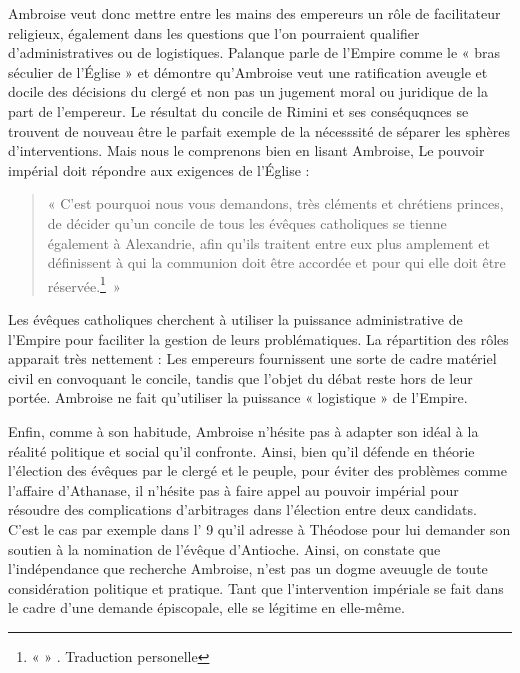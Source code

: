\bigskip

Ambroise veut donc mettre entre les mains des empereurs un rôle de facilitateur religieux, également dans les questions que l'on pourraient qualifier d'administratives ou de logistiques. Palanque parle de l'Empire comme le « bras séculier de l'Église » et démontre qu'Ambroise veut une ratification aveugle et docile des décisions du clergé et non pas un jugement moral ou juridique de la part de l'empereur\autocite[372]{palanque_ambroise}. Le résultat du concile de Rimini et ses conséquqnces se trouvent de nouveau être le parfait exemple de la nécesssité de séparer les sphères d'interventions. Mais nous le comprenons bien en lisant Ambroise, Le pouvoir impérial doit répondre aux exigences de l'Église :

\bigskip

\begin{quote}
    « C'est pourquoi nous vous demandons, très cléments et chrétiens princes, de décider qu'un concile de tous les évêques catholiques se tienne également à Alexandrie, afin qu'ils traitent entre eux plus amplement et définissent à qui la communion doit être accordée et pour qui elle doit être réservée.\footnote{«  » \cite[\nopp ec. 6, 5]{ambroise_csel_82_3}. {Traduction personelle}}~»
\end{quote}

\bigskip

Les évêques catholiques cherchent à utiliser la puissance administrative de l'Empire pour faciliter la gestion de leurs problématiques. La répartition des rôles apparait très nettement : Les empereurs fournissent une sorte de cadre matériel civil en convoquant le concile, tandis que l'objet du débat reste hors de leur portée. Ambroise ne fait qu'utiliser la puissance « logistique » de l'Empire.

\bigskip

Enfin, comme à son habitude, Ambroise n'hésite pas à adapter son idéal à la réalité politique et social qu'il confronte. Ainsi, bien qu'il défende en théorie l'élection des évêques par le clergé et le peuple, pour éviter des problèmes comme l'affaire d'Athanase, il n'hésite pas à faire appel au pouvoir impérial pour résoudre des complications d'arbitrages dans l'élection entre deux candidats. C'est le cas par exemple dans l' 9 qu'il adresse à Théodose pour lui demander son soutien à la nomination de l'évêque d'Antioche. Ainsi, on constate que l'indépendance que recherche Ambroise, n'est pas un dogme aveuugle de toute considération politique et pratique. Tant que l'intervention impériale se fait dans le cadre d'une demande épiscopale, elle se légitime en elle-même.

